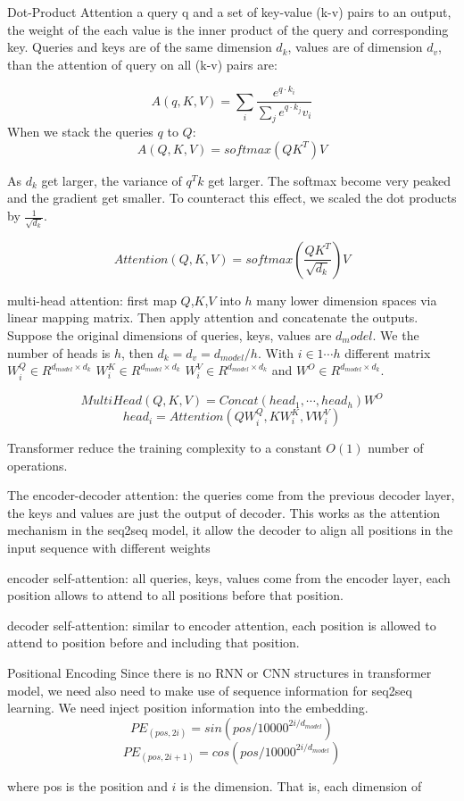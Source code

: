 	
	Dot-Product Attention
	a query q and a set of key-value (k-v) pairs to an output, the weight of the each value is the inner product of the query and corresponding key.
	Queries and keys are of the same dimension ${d_k}$, values are of dimension ${d_v}$, than the attention of query on all (k-v) pairs are:
	
	\[ A(q, K, V) = \sum_{i}{ \frac{e^{q\cdot k_i}}{\sum_{j} e^{q\cdot k_j} v_i}}\]
	When we stack the queries ${q}$ to ${Q}$:
	\[ A(Q, K, V) = softmax(QK^T)V\]
	
	As ${d_k}$ get larger, the variance of ${q^T k}$ get larger.  The softmax become very peaked and the gradient get smaller. To counteract this effect, we scaled the dot products by ${\frac{1}{\sqrt{d_k}}}$.
	
	\[ Attention(Q,K,V) = softmax(\frac{QK^T}{\sqrt{d_k}})V\]
	
	
	multi-head attention: first map $Q$,$K$,$V$ into $h$ many lower dimension spaces via linear mapping matrix. Then apply attention and concatenate the outputs. 
	Suppose the original dimensions of queries, keys, values are ${d_model}$. We the number of heads is ${h}$, then ${d_k = d_v = d_{model}/h}$. With ${i \in 1 \cdots h}$ different matrix ${W_i^Q \in R^{d_{model}\times d_k}}$ ${W_i^K \in R^{d_{model}\times d_k}}$ ${W_i^V \in R^{d_{model}\times d_k}}$ and ${W^O \in R^{d_{model}\times d_k}}$.
	
	\[ MultiHead(Q, K, V) = Concat(head_1, \cdots, head_h)W^O \]
	\[head_i = Attention(QW_i^Q, KW_i^K, VW_i^V) \]
	
	
	Transformer reduce the training complexity to a constant ${O(1)}$ number of operations.
	
	
	
	The encoder-decoder attention: the queries come from the previous decoder layer, the keys and values are just the output of decoder. This works as the attention mechanism in the seq2seq model, it allow the decoder to align all positions in the input sequence with different weights
	
	encoder self-attention: all queries, keys, values come from the encoder layer, each position allows to attend to all positions before that position.
	
	decoder self-attention: similar to encoder attention, each position is allowed to attend to position before and including that position.
	
	
	Positional Encoding
	Since there is no RNN or CNN structures in transformer model, we need also need to make use of sequence information for seq2seq learning. We need inject position information into the embedding.
	\[PE_{(pos, 2i)} = sin(pos/ 10000 ^{2i / d_{model}})\]
	\[ PE_{(pos, 2i+1)} = cos(pos / 10000^{2i/d_{model}})\]
	
	
	where pos is the position and $i$ is the dimension. That is, each dimension of 
	
	
	
	
	
	
	
	
	
	
	
	
	
	
	
	
	
	
	
	
	
	
	
	
	
	
	
	
	
	
	
	
	
	